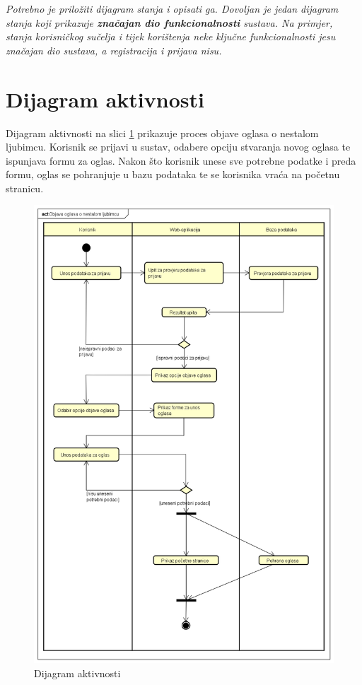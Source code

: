 			\textit{Potrebno je priložiti dijagram stanja i opisati ga. Dovoljan je jedan dijagram stanja koji prikazuje \textbf{značajan dio funkcionalnosti} sustava. Na primjer, stanja korisničkog sučelja i tijek korištenja neke ključne funkcionalnosti jesu značajan dio sustava, a registracija i prijava nisu. }
			
			
			\eject 
		
		\section{Dijagram aktivnosti}
			
			Dijagram aktivnosti na slici \ref{dijagram_aktivnosti} prikazuje proces objave oglasa o nestalom ljubimcu. Korisnik se prijavi u sustav, odabere opciju stvaranja novog oglasa te ispunjava formu za oglas. Nakon što korisnik unese sve potrebne podatke i preda formu, oglas se pohranjuje u bazu podataka te se korisnika vraća na početnu stranicu.
			 
			 \begin{figure}[H]
				\includegraphics[scale=0.5]{slike/dijagram_aktivnosti.PNG} 
				\centering
				\caption{Dijagram aktivnosti}
				\label{dijagram_aktivnosti}
			\end{figure}
			
